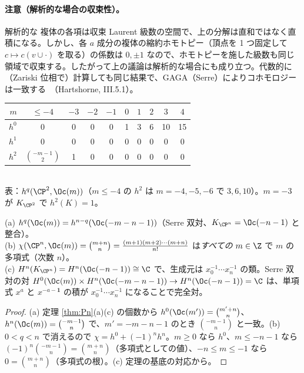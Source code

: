 \paragraph{注意（解析的な場合の収束性）。}解析的な \Cech{} 複体の各項は収束 Laurent 級数の空間で、上の分解は直和ではなく直積になる。しかし、各 $a$ 成分の複体の縮約ホモトピー（頂点を 1 つ固定して $c\mapsto c(v\cup\cdot)$ を取る）の係数は $0,\pm1$ なので、ホモトピーを施した級数も同じ領域で収束する。したがって上の議論は解析的な場合にも成り立つ。代数的に（Zariski 位相で）計算しても同じ結果で、GAGA（Serre）によりコホモロジーは一致する\tC\ （Hartshorne, III.5.1）。

\begin{center}
\small
\begin{tabular}{r|ccccccccc}
$m$ & $\le-4$ & $-3$ & $-2$ & $-1$ & $0$ & $1$ & $2$ & $3$ & $4$\\\hline
$h^0$ & 0 & 0 & 0 & 0 & 1 & 3 & 6 & 10 & 15\\
$h^1$ & 0&0&0&0&0&0&0&0&0\\
$h^2$ & $\binom{-m-1}2$ & 1 & 0 & 0 & 0&0&0&0&0
\end{tabular}\\[2pt]
\small 表：$h^q(\CP^2,\Oc(m))$（$m\le-4$ の $h^2$ は $m=-4,-5,-6$ で $3,6,10$）。$m=-3$ が $K_{\CP^2}$ で $h^2(K)=1$。
\end{center}

\begin{cor}\label{cor:PnConsequences}\tP
(a) $h^q(\Oc(m))=h^{n-q}(\Oc(-m-n-1))$（Serre 双対、$K_{\CP^n}=\Oc(-n-1)$ と整合）。\\
(b) $\chi(\CP^n,\Oc(m))=\binom{m+n}n=\frac{(m+1)(m+2)\cdots(m+n)}{n!}$ は\emph{すべての} $m\in\Z$ で $m$ の多項式（次数 $n$）。\\
(c) $H^n(K_{\CP^n})=H^n(\Oc(-n-1))\cong\C$ で、生成元は $x_0^{-1}\cdots x_n^{-1}$ の類。Serre 双対の対 $H^0(\Oc(m))\times H^n(\Oc(-m-n-1))\to H^n(\Oc(-n-1))=\C$ は、単項式 $x^a$ と $x^{-a-\mathbf 1}$ の積が $x_0^{-1}\cdots x_n^{-1}$ になることで完全対。
\end{cor}
\begin{proof}
(a) 定理 \ref{thm:Pn}(a)(c) の個数から $h^0(\Oc(m'))=\binom{m'+n}n$、$h^n(\Oc(m))=\binom{-m-1}n$ で、$m'=-m-n-1$ のとき $\binom{-m-1}n$ と一致。(b) $0<q<n$ で消えるので $\chi=h^0+(-1)^nh^n$。$m\ge0$ なら $h^0$、$m\le-n-1$ なら $(-1)^n\binom{-m-1}n=\binom{m+n}n$（多項式としての値）、$-n\le m\le-1$ なら $0=\binom{m+n}n$（多項式の根）。(c) 定理の基底の対応から。
\end{proof}

